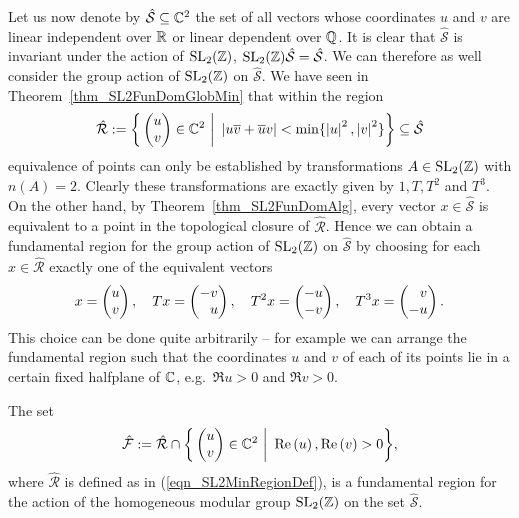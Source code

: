 Let us now denote by $\hat{\mathcal{S}} \subseteq \mathbb{C}^2$ the set of all vectors whose coordinates $u$ and $v$ are linear independent over $\mathbb{R}$ or linear dependent over $\mathbb{Q}$. It is clear that $\hat{\mathcal{S}}$ is invariant under the action of $\operatorname{SL}_{2}(\mathbb{Z})$, \ie $\operatorname{SL}_{2}(\mathbb{Z})\hat{\mathcal{S}} = \hat{\mathcal{S}}$. We can therefore as well consider the group action of $\operatorname{SL}_{2}(\mathbb{Z})$ on $\hat{\mathcal{S}}$. We have seen in Theorem~\ref{thm_SL2FunDomGlobMin} that within the region
\begin{equation}
\label{eqn_SL2MinRegionDef}
\hat{\mathcal{R}} := \bigg\{ \begin{pmatrix}u \\ v\end{pmatrix} \in \mathbb{C}^2 \ \bigg| \ \left|u\overline{v} + \overline{u}v\right| < \min \{\left|u\right|^2, \left|v\right|^2\} \bigg\} \subseteq \hat{\mathcal{S}}
\end{equation}
equivalence of points can only be established by transformations $A \in \operatorname{SL}_{2}(\mathbb{Z})$ with $n(A) = 2$. Clearly these transformations are exactly given by $1, T, T^2$ and $T^3$. On the other hand, by Theorem~\ref{thm_SL2FunDomAlg}, every vector $x \in \hat{\mathcal{S}}$ is equivalent to a point in the topological closure of $\hat{\mathcal{R}}$. Hence we can obtain a fundamental region for the group action of $\operatorname{SL}_{2}(\mathbb{Z})$ on $\hat{\mathcal{S}}$ by choosing for each $x \in \hat{\mathcal{R}}$ exactly one of the equivalent vectors 
\begin{equation*}
x = \begin{pmatrix}u \\ v\end{pmatrix},\quad 
Tx = \begin{pmatrix}-v \\ \phantom{+}u\end{pmatrix},\quad
T^2x = \begin{pmatrix}-u \\ -v\end{pmatrix},\quad
T^3x = \begin{pmatrix}\phantom{+}v \\ -u\end{pmatrix}.
\end{equation*}
This choice can be done quite arbitrarily -- for example we can arrange the fundamental region such that the coordinates $u$ and $v$ of each of its points lie in a certain fixed halfplane of $\mathbb{C}$, e.g.\ $\Re{u} > 0$ and $\Re{v} > 0$.
\begin{corollary}
\label{cor_SL2FunDom}
The set
\begin{equation}
\hat{\mathcal{F}} := \hat{\mathcal{R}} \cap \bigg\{ \begin{pmatrix}u \\ v\end{pmatrix} \in \mathbb{C}^2 \ \bigg| \ \operatorname{Re}\left(u\right), \operatorname{Re}\left(v\right) > 0 \bigg\},
\end{equation}
where $\hat{\mathcal{R}}$ is defined as in (\ref{eqn_SL2MinRegionDef}), is a fundamental region for the action of the homogeneous modular group $\operatorname{SL}_{2}(\mathbb{Z})$ on the set $\hat{\mathcal{S}}$.
\end{corollary}
